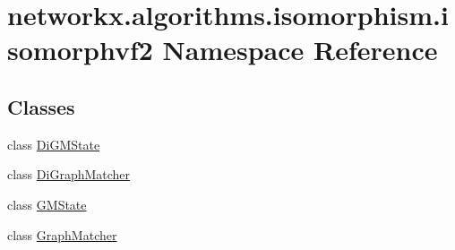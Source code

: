 \hypertarget{namespacenetworkx_1_1algorithms_1_1isomorphism_1_1isomorphvf2}{}\section{networkx.\+algorithms.\+isomorphism.\+isomorphvf2 Namespace Reference}
\label{namespacenetworkx_1_1algorithms_1_1isomorphism_1_1isomorphvf2}
\subsection*{Classes}
\begin{DoxyCompactItemize}
\item 
class \hyperlink{classnetworkx_1_1algorithms_1_1isomorphism_1_1isomorphvf2_1_1DiGMState}{Di\+G\+M\+State}
\item 
class \hyperlink{classnetworkx_1_1algorithms_1_1isomorphism_1_1isomorphvf2_1_1DiGraphMatcher}{Di\+Graph\+Matcher}
\item 
class \hyperlink{classnetworkx_1_1algorithms_1_1isomorphism_1_1isomorphvf2_1_1GMState}{G\+M\+State}
\item 
class \hyperlink{classnetworkx_1_1algorithms_1_1isomorphism_1_1isomorphvf2_1_1GraphMatcher}{Graph\+Matcher}
\end{DoxyCompactItemize}


